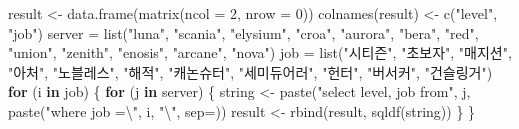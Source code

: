 \documentclass[
]{article}
\newenvironment{Shaded}{\begin{snugshade}}{\end{snugshade}}
\newcommand{\AttributeTok}[1]{\textcolor[rgb]{0.77,0.63,0.00}{#1}}
\newcommand{\ControlFlowTok}[1]{\textcolor[rgb]{0.13,0.29,0.53}{\textbf{#1}}}
\newcommand{\DecValTok}[1]{\textcolor[rgb]{0.00,0.00,0.81}{#1}}
\newcommand{\FunctionTok}[1]{\textcolor[rgb]{0.00,0.00,0.00}{#1}}
\newcommand{\NormalTok}[1]{#1}
\newcommand{\OtherTok}[1]{\textcolor[rgb]{0.56,0.35,0.01}{#1}}
\newcommand{\SpecialCharTok}[1]{\textcolor[rgb]{0.00,0.00,0.00}{#1}}
\newcommand{\StringTok}[1]{\textcolor[rgb]{0.31,0.60,0.02}{#1}}
\begin{document}
\begin{Shaded}
\begin{Highlighting}[]
\NormalTok{result }\OtherTok{\textless{}{-}} \FunctionTok{data.frame}\NormalTok{(}\FunctionTok{matrix}\NormalTok{(}\AttributeTok{ncol =} \DecValTok{2}\NormalTok{, }\AttributeTok{nrow =} \DecValTok{0}\NormalTok{))}
\FunctionTok{colnames}\NormalTok{(result) }\OtherTok{\textless{}{-}} \FunctionTok{c}\NormalTok{(}\StringTok{"level"}\NormalTok{, }\StringTok{"job"}\NormalTok{)}
\NormalTok{server }\OtherTok{=} \FunctionTok{list}\NormalTok{(}\StringTok{"luna"}\NormalTok{, }\StringTok{"scania"}\NormalTok{, }\StringTok{"elysium"}\NormalTok{, }\StringTok{"croa"}\NormalTok{, }\StringTok{"aurora"}\NormalTok{, }\StringTok{"bera"}\NormalTok{, }\StringTok{"red"}\NormalTok{, }\StringTok{"\textquotesingle{}union\textquotesingle{}"}\NormalTok{, }\StringTok{"zenith"}\NormalTok{, }\StringTok{"enosis"}\NormalTok{, }\StringTok{"arcane"}\NormalTok{, }\StringTok{"nova"}\NormalTok{)}
\NormalTok{job }\OtherTok{=} \FunctionTok{list}\NormalTok{(}\StringTok{"시티즌"}\NormalTok{, }\StringTok{"초보자"}\NormalTok{, }\StringTok{"매지션"}\NormalTok{, }\StringTok{"아처"}\NormalTok{, }\StringTok{"노블레스"}\NormalTok{, }\StringTok{"해적"}\NormalTok{, }\StringTok{"캐논슈터"}\NormalTok{, }\StringTok{"세미듀어러"}\NormalTok{, }\StringTok{"헌터"}\NormalTok{, }\StringTok{"버서커"}\NormalTok{, }\StringTok{"건슬링거"}\NormalTok{)}
\ControlFlowTok{for}\NormalTok{ (i }\ControlFlowTok{in}\NormalTok{ job) \{}
  \ControlFlowTok{for}\NormalTok{ (j }\ControlFlowTok{in}\NormalTok{ server) \{}
\NormalTok{    string }\OtherTok{\textless{}{-}} \FunctionTok{paste}\NormalTok{(}\StringTok{"select level, job from"}\NormalTok{, j, }\FunctionTok{paste}\NormalTok{(}\StringTok{"where job =}\SpecialCharTok{\textbackslash{}\textquotesingle{}}\StringTok{"}\NormalTok{, i, }\StringTok{"}\SpecialCharTok{\textbackslash{}\textquotesingle{}}\StringTok{"}\NormalTok{, }\AttributeTok{sep=}\StringTok{\textquotesingle{}\textquotesingle{}}\NormalTok{))}
\NormalTok{    result }\OtherTok{\textless{}{-}} \FunctionTok{rbind}\NormalTok{(result, }\FunctionTok{sqldf}\NormalTok{(string))}
\NormalTok{  \}}
\NormalTok{\}}


\end{Highlighting}
\end{Shaded}
\end{document}
